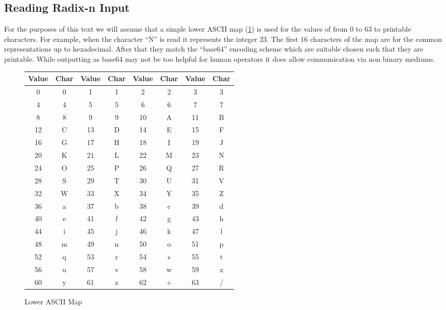\documentclass[b5paper]{book}
\begin{document}
\subsection{Reading Radix-n Input}
For the purposes of this text we will assume that a simple lower ASCII map (\ref{fig:ASC}) is used for the values of from $0$ to $63$ to 
printable characters.  For example, when the character ``N'' is read it represents the integer $23$.  The first $16$ characters of the
map are for the common representations up to hexadecimal.  After that they match the ``base64'' encoding scheme which are suitable chosen
such that they are printable.  While outputting as base64 may not be too helpful for human operators it does allow communication via non binary
mediums.

\newpage\begin{figure}[here]
\begin{center}
\begin{tabular}{cc|cc|cc|cc}
\hline \textbf{Value} & \textbf{Char} & \textbf{Value} & \textbf{Char} & \textbf{Value} & \textbf{Char} &  \textbf{Value} & \textbf{Char} \\
\hline 
0 & 0 & 1 & 1 & 2 & 2 & 3 & 3 \\
4 & 4 & 5 & 5 & 6 & 6 & 7 & 7 \\
8 & 8 & 9 & 9 & 10 & A & 11 & B \\
12 & C & 13 & D & 14 & E & 15 & F \\
16 & G & 17 & H & 18 & I & 19 & J \\
20 & K & 21 & L & 22 & M & 23 & N \\
24 & O & 25 & P & 26 & Q & 27 & R \\
28 & S & 29 & T & 30 & U & 31 & V \\
32 & W & 33 & X & 34 & Y & 35 & Z \\
36 & a & 37 & b & 38 & c & 39 & d \\
40 & e & 41 & f & 42 & g & 43 & h \\
44 & i & 45 & j & 46 & k & 47 & l \\
48 & m & 49 & n & 50 & o & 51 & p \\
52 & q & 53 & r & 54 & s & 55 & t \\
56 & u & 57 & v & 58 & w & 59 & x \\
60 & y & 61 & z & 62 & $+$ & 63 & $/$ \\
\hline
\end{tabular}
\end{center}
\caption{Lower ASCII Map}
\label{fig:ASC}
\end{figure}
\end{document}
